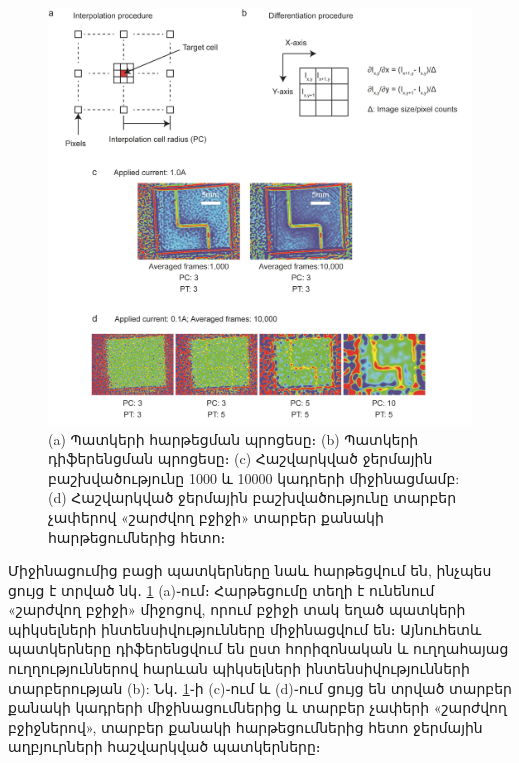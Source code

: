 \documentclass[12pt, fleqn]{report}
\begin{document}
\begin{figure}
    \centering
    \includegraphics[width=1.0\textwidth]{data/TEOIM/4.png}
    \caption{(a) Պատկերի հարթեցման պրոցեսը։ (b) Պատկերի դիֆերենցման պրոցեսը։ (c) Հաշվարկված ջերմային բաշխվածությունը 1000 և 10000 կադրերի միջինացմամբ: (d) Հաշվարկված ջերմային բաշխվածությունը տարբեր չափերով «շարժվող բջիջի» տարբեր քանակի հարթեցումներից հետո։}
    \label{fig:frame-interp}
\end{figure}
Միջինացումից բացի պատկերները նաև հարթեցվում են, ինչպես ցույց է տրված նկ․ \ref{fig:frame-interp} (a)֊ում։ Հարթեցումը տեղի է ունենում «շարժվող բջիջի» միջոցով, որում բջիջի տակ եղած պատկերի պիկսելների ինտենսիվությունները միջինացվում են։ Այնուհետև պատկերները դիֆերենցվում են ըստ հորիզոնական և ուղղահայաց ուղղություններով հարևան պիկսելների ինտենսիվությունների տարբերության (b): Նկ․ \ref{fig:frame-interp}֊ի (c)֊ում և (d)֊ում ցույց են տրված տարբեր քանակի կադրերի միջինացումներից և տարբեր չափերի «շարժվող բջիջներով», տարբեր քանակի հարթեցումներից հետո ջերմային աղբյուրների հաշվարկված պատկերները։
\end{document}
